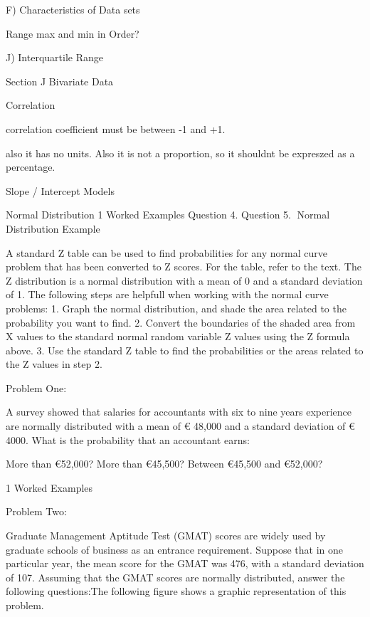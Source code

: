 F) Characteristics of Data sets

Range max and min
in Order?

J) Interquartile Range

Section J Bivariate Data 

Correlation


correlation coefficient must be between -1 and +1.

also it has no units. Also it is not a proportion, so it shouldnt be expreszed as a percentage.


Slope / Intercept  Models 

Normal Distribution
1 Worked Examples
Question 4.
Question 5.
Normal Distribution
Example

A standard Z table can be used to find probabilities for any normal curve problem that has been converted to Z scores. For the table, refer to the text. The Z distribution is a normal distribution with a mean of 0 and a standard deviation of 1.
The following steps are helpfull when working with the normal curve problems:
1. Graph the normal distribution, and shade the area related to the probability you want to find.
2. Convert the boundaries of the shaded area from X values to the standard normal random variable Z values using the Z formula above.
3. Use the standard Z table to find the probabilities or the areas related to the Z values in step 2.
 
Problem One:
 
A survey showed that salaries for accountants with six to nine years experience are normally distributed with a mean of € 48,000 and a standard deviation of € 4000. What is the probability that an accountant earns:
 
More than €52,000?                                                            
More than €45,500?
Between €45,500 and €52,000?   

1 Worked Examples
 
Problem Two:

Graduate Management Aptitude Test (GMAT) scores are widely used by graduate schools of business as an entrance requirement. Suppose that in one particular year, the mean score for the GMAT was 476, with a standard deviation of 107. Assuming that the GMAT scores are normally distributed, answer the following questions:The following figure shows a graphic representation of this problem.




